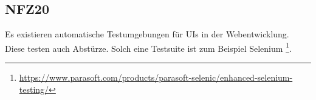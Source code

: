 \subsection*{NFZ20}

Es existieren automatische Testumgebungen für UIs in der Webentwicklung.
Diese testen auch Abstürze.
Solch eine Testsuite ist zum Beispiel Selenium \footnote{\href{https://www.parasoft.com/products/parasoft-selenic/enhanced-selenium-testing/}{https://www.parasoft.com/products/parasoft-selenic/enhanced-selenium-testing/}}.